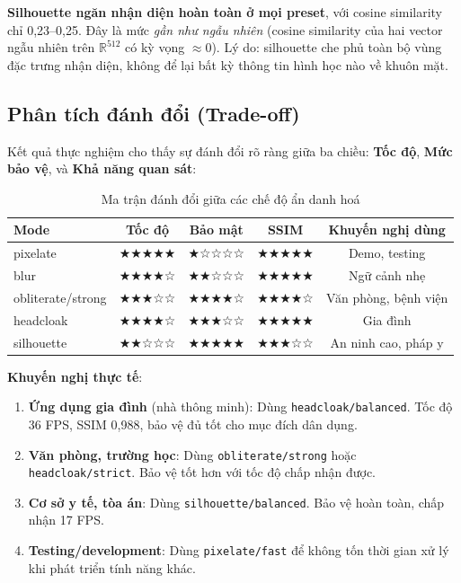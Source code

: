 \textbf{Silhouette ngăn nhận diện hoàn toàn ở mọi preset}, với cosine similarity chỉ 0,23--0,25. Đây là mức \textit{gần như ngẫu nhiên} (cosine similarity của hai vector ngẫu nhiên trên $\mathbb{R}^{512}$ có kỳ vọng $\approx 0$). Lý do: silhouette che phủ toàn bộ vùng đặc trưng nhận diện, không để lại bất kỳ thông tin hình học nào về khuôn mặt.

\subsection{Phân tích đánh đổi (Trade-off)}
\label{subsec:tradeoff}

Kết quả thực nghiệm cho thấy sự đánh đổi rõ ràng giữa ba chiều: \textbf{Tốc độ}, \textbf{Mức bảo vệ}, và \textbf{Khả năng quan sát}:

\begin{table}[H]
\centering
\caption{Ma trận đánh đổi giữa các chế độ ẩn danh hoá}
\label{tab:tradeoff}
\begin{tabular}{|l|c|c|c|c|}
\hline
\textbf{Mode} & \textbf{Tốc độ} & \textbf{Bảo mật} & \textbf{SSIM} & \textbf{Khuyến nghị dùng} \\
\hline
pixelate & ★★★★★ & ★☆☆☆☆ & ★★★★★ & Demo, testing \\
blur & ★★★★☆ & ★★☆☆☆ & ★★★★★ & Ngữ cảnh nhẹ \\
obliterate/strong & ★★★☆☆ & ★★★★☆ & ★★★★☆ & Văn phòng, bệnh viện \\
headcloak & ★★★★☆ & ★★★☆☆ & ★★★★★ & Gia đình \\
silhouette & ★★☆☆☆ & ★★★★★ & ★★★☆☆ & An ninh cao, pháp y \\
\hline
\end{tabular}
\end{table}

\medskip
\textbf{Khuyến nghị thực tế}:

\begin{enumerate}[1.]
    \item \textbf{Ứng dụng gia đình} (nhà thông minh): Dùng \texttt{headcloak/balanced}. Tốc độ 36 FPS, SSIM 0,988, bảo vệ đủ tốt cho mục đích dân dụng.
    \item \textbf{Văn phòng, trường học}: Dùng \texttt{obliterate/strong} hoặc \texttt{headcloak/strict}. Bảo vệ tốt hơn với tốc độ chấp nhận được.
    \item \textbf{Cơ sở y tế, tòa án}: Dùng \texttt{silhouette/balanced}. Bảo vệ hoàn toàn, chấp nhận 17 FPS.
    \item \textbf{Testing/development}: Dùng \texttt{pixelate/fast} để không tốn thời gian xử lý khi phát triển tính năng khác.
\end{enumerate}

